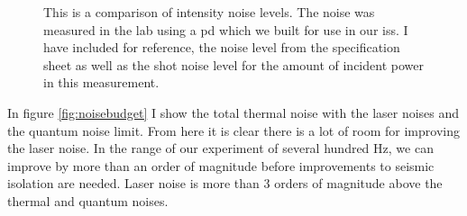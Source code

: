 \begin{figure}
  \caption[Intensity Noise]{This is a comparison of intensity noise
    levels. The noise was measured in the lab using a \ac{pd} which
    we built for use in our \ac{iss}. I have included for reference, the
    noise level from the specification sheet as well as the shot noise
    level for the amount of incident power in this measurement.
    }
  \label{fig:intensitynoise}
\end{figure}

In figure \ref{fig:noisebudget} I show the total thermal noise with the laser
noises and the quantum noise limit. From here it is clear there is a lot of
room for improving the laser noise. In the range of our experiment of several
hundred Hz, we can improve by more than an order of magnitude before
improvements to seismic isolation are needed. Laser noise is more than 3 orders
of magnitude above the thermal and quantum noises.


